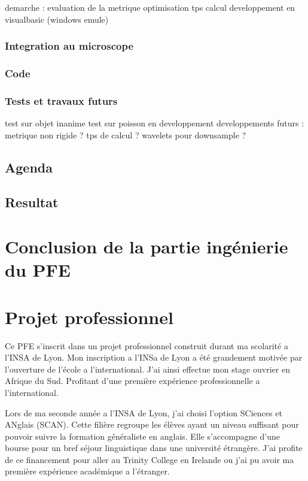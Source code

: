 demarche : evaluation de la metrique
optimisation tps calcul
developpement en visualbasic (windows emule)


\subsubsection{Integration au microscope}



\subsubsection{Code}



\subsubsection{Tests et travaux futurs}
test sur objet inanime
test sur poisson en developpement
developpements futurs :
metrique non rigide ?
tps de calcul ?
wavelets pour downsample ?


\subsection{Agenda}





\subsection{Resultat}





\section{Conclusion de la partie ingénierie du PFE}


\section{Projet professionnel}

Ce PFE s'inscrit dans un projet professionnel construit durant ma scolarité a l'INSA de Lyon.
Mon inscription a l'INSa de Lyon a été grandement motivée par l'ouverture de l'école a l'international. J'ai ainsi effectue mon stage ouvrier en Afrique du Sud. Profitant d'une première expérience professionnelle a l'international.

Lors de ma seconde année a l'INSA de Lyon, j'ai choisi l'option SCiences et ANglais (SCAN). Cette filière regroupe les élèves ayant un niveau suffisant pour pouvoir suivre la formation généraliste en anglais. Elle s'accompagne d'une bourse pour un bref séjour linguistique dans une université étrangère. J'ai profite de ce financement pour aller au Trinity College en Irelande ou j'ai pu avoir ma première expérience académique a l'étranger.

